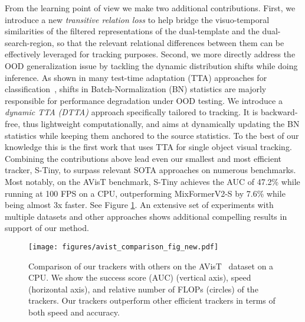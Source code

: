 From the learning point of view we make two additional contributions. First, we introduce a new \emph{transitive relation loss} to help bridge the visuo-temporal similarities of the filtered representations of the dual-template and the dual-search-region, so that the relevant relational differences between them can be effectively leveraged for tracking purposes. Second, we more directly address the OOD generalization issue by tackling the dynamic distribution shifts while doing inference. As shown in many test-time adaptation (TTA) approaches for classification~\cite{wang2020tent,mirza2022norm, pan2018two, niu2022efficient, schneider2020improving, li2016revisiting}, shifts in Batch-Normalization (BN) statistics are majorly responsible for performance degradation under OOD testing. We introduce a \emph{dynamic TTA (DTTA)} approach specifically tailored to tracking. It is backward-free, thus lightweight computationally, and aims at dynamically updating the BN statistics while keeping them anchored to the source statistics. To the best of our knowledge this is the first work that uses TTA for single object visual tracking.\\


Combining the contributions above lead even our smallest and most efficient tracker, S-Tiny, to surpass relevant SOTA approaches on numerous benchmarks. Most notably, on the AVisT benchmark, S-Tiny achieves the AUC of 47.2\% while running at 100 FPS on a CPU, outperforming MixFormerV2-S by 7.6\% while being almost 3x faster. See Figure \ref{fig:avist_comparision_fig}. An extensive set of experiments with multiple datasets and other approaches shows additional compelling results in support of our method.

\begin{figure}
    \centering
        \texttt{[image: figures/avist\_comparison\_fig\_new.pdf]}
    \caption{Comparison of our trackers with others on the AVisT~\cite{noman2022avist} dataset on a CPU. We show the success score (AUC) (vertical axis), speed (horizontal axis), and relative number of FLOPs (circles) of the trackers. Our trackers outperform other efficient trackers in terms of both speed and accuracy.}
    \label{fig:avist_comparision_fig}
\end{figure}
